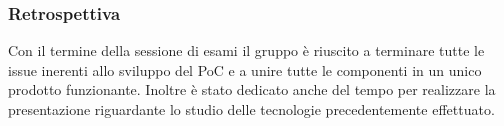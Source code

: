 \subsubsection{Retrospettiva}
\label{sec:sprint7_retrospettiva}
Con il termine della sessione di esami il gruppo è riuscito a terminare tutte le issue inerenti allo sviluppo del PoC e a unire tutte le componenti in un unico prodotto funzionante.
Inoltre è stato dedicato anche del tempo per realizzare la presentazione riguardante lo studio delle tecnologie precedentemente effettuato.